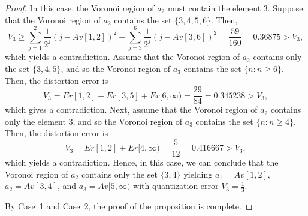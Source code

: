 \documentclass[10pt,a4paper]{amsart}
\newcommand{\set}[1]{\{#1\}}%
\begin{document}
\begin{proof}
In this case, the Voronoi region of $a_2$ must contain the element $3$. Suppose that the Voronoi region of $a_2$ contains the set $\set{3, 4, 5, 6}$. Then,
\[V_3\geq  \sum_{j=1}^2\frac 1 {2^j}(j-Av[1,2])^2+ \sum_{j=3}^6\frac 1 {2^j}(j-Av[3, 6])^2 =\frac{59}{160} =0.36875>V_3,\]
which yields a contradiction. Assume that the Voronoi region of $a_2$ contains only the set $\set{3, 4, 5}$, and so the Voronoi region of $a_3$ contains the set $\set{n : n\geq 6}$. Then, the distortion error is
\[V_3=Er[1,2]+Er[3,5]+Er[6, \infty)=\frac{29}{84} =0.345238>V_3,\]
which gives a contradiction.
Next, assume that the Voronoi region of $a_2$ contains only the element $3$, and so the Voronoi region of $a_3$ contains the set $\set{n : n\geq 4}$. Then, the distortion error is
\[V_3=Er[1,2]+Er[4, \infty)=\frac{5}{12}=0.416667>V_3,\]
which yields a contradiction.
Hence, in this case, we can conclude that the Voronoi region of $a_2$ contains only the set $\set{3,4}$ yielding $a_1=Av[1,2]$, $a_2=Av[3,4]$, and $a_3=Av[5, \infty)$ with quantization error $V_3=\frac 13$.

By Case~1 and Case~2, the proof of the proposition is complete.
\end{proof}
\end{document}
